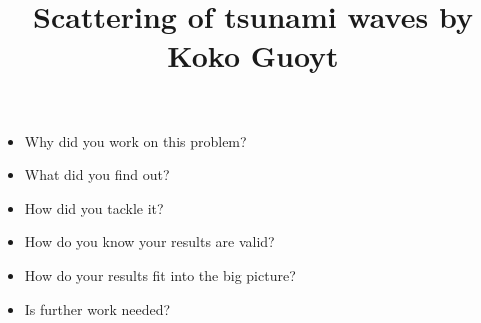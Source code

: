 



\title{Scattering of tsunami waves by Koko Guoyt}
\maketitle

\begin{itemize}
\item Why did you work on this problem?
\item What did you find out?
\item How did you tackle it?
\item How do you know your results are valid?
\item How do your results fit into the big picture?
\item Is further work needed?
\end{itemize}

